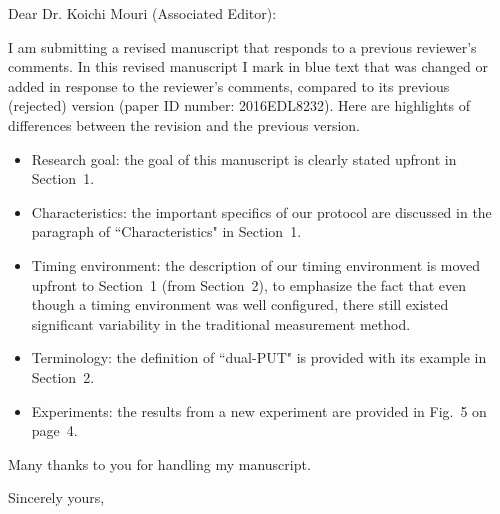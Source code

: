 \documentclass{letter} %
\begin{document}
\begin{letter}
\vspace{0.5in}
 
\opening{Dear Dr. Koichi Mouri (Associated Editor):} 
 
\noindent 

I am submitting a revised manuscript that responds to a previous reviewer's comments. 
In this revised manuscript I mark in blue text that was changed or added in response to the reviewer's comments, 
compared to its previous (rejected) version (paper ID number: 2016EDL8232). 
Here are highlights of differences between the revision and the previous version.

\begin{itemize}

\item Research goal: the goal of this manuscript is clearly stated upfront in Section~1. 

\item Characteristics: the important specifics of our protocol are discussed 
in the paragraph of ``Characteristics" in Section~1. 

\item Timing environment: the description of our timing environment 
is moved upfront to Section~1 (from Section~2), 
to emphasize the fact that even though a timing environment was well configured, 
there still existed significant variability in the traditional measurement method.

\item Terminology: the definition of ``dual-PUT" is provided with its example in Section~2. 

\item Experiments: the results from a new experiment are provided in Fig.~5 on page~4.

\end{itemize} 

Many thanks to you for handling my manuscript.

\closing{Sincerely yours,} 

\end{letter}
 
\end{document}
